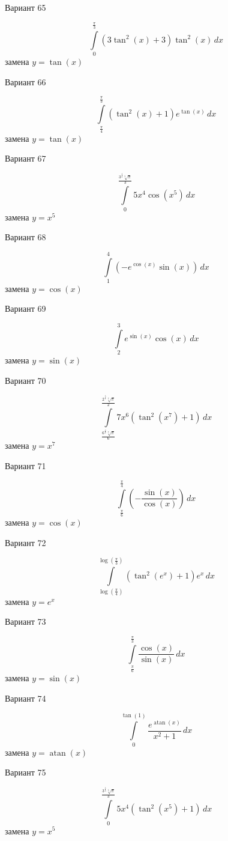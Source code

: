 \documentclass[11pt]{report}
\begin{document}
Вариант 65

$$\int\limits_{0}^{\frac{\pi}{3}} \left(3 \tan^{2}{\left(x \right)} + 3\right) \tan^{2}{\left(x \right)}\, dx$$
замена $y = \tan{\left(x \right)}$

Вариант 66

$$\int\limits_{\frac{\pi}{4}}^{\frac{\pi}{3}} \left(\tan^{2}{\left(x \right)} + 1\right) e^{\tan{\left(x \right)}}\, dx$$
замена $y = \tan{\left(x \right)}$

Вариант 67

$$\int\limits_{0}^{\frac{3^{\frac{4}{5}} \sqrt[5]{\pi}}{3}} 5 x^{4} \cos{\left(x^{5} \right)}\, dx$$
замена $y = x^{5}$

Вариант 68

$$\int\limits_{1}^{4} \left(- e^{\cos{\left(x \right)}} \sin{\left(x \right)}\right)\, dx$$
замена $y = \cos{\left(x \right)}$

Вариант 69

$$\int\limits_{2}^{3} e^{\sin{\left(x \right)}} \cos{\left(x \right)}\, dx$$
замена $y = \sin{\left(x \right)}$

Вариант 70

$$\int\limits_{\frac{6^{\frac{6}{7}} \sqrt[7]{\pi}}{6}}^{\frac{2^{\frac{5}{7}} \sqrt[7]{\pi}}{2}} 7 x^{6} \left(\tan^{2}{\left(x^{7} \right)} + 1\right)\, dx$$
замена $y = x^{7}$

Вариант 71

$$\int\limits_{\frac{\pi}{6}}^{\frac{\pi}{4}} \left(- \frac{\sin{\left(x \right)}}{\cos{\left(x \right)}}\right)\, dx$$
замена $y = \cos{\left(x \right)}$

Вариант 72

$$\int\limits_{\log{\left(\frac{\pi}{4} \right)}}^{\log{\left(\frac{\pi}{3} \right)}} \left(\tan^{2}{\left(e^{x} \right)} + 1\right) e^{x}\, dx$$
замена $y = e^{x}$

Вариант 73

$$\int\limits_{\frac{\pi}{6}}^{\frac{\pi}{3}} \frac{\cos{\left(x \right)}}{\sin{\left(x \right)}}\, dx$$
замена $y = \sin{\left(x \right)}$

Вариант 74

$$\int\limits_{0}^{\tan{\left(1 \right)}} \frac{e^{\operatorname{atan}{\left(x \right)}}}{x^{2} + 1}\, dx$$
замена $y = \operatorname{atan}{\left(x \right)}$

Вариант 75

$$\int\limits_{0}^{\frac{3^{\frac{4}{5}} \sqrt[5]{\pi}}{3}} 5 x^{4} \left(\tan^{2}{\left(x^{5} \right)} + 1\right)\, dx$$
замена $y = x^{5}$
\end{document}
